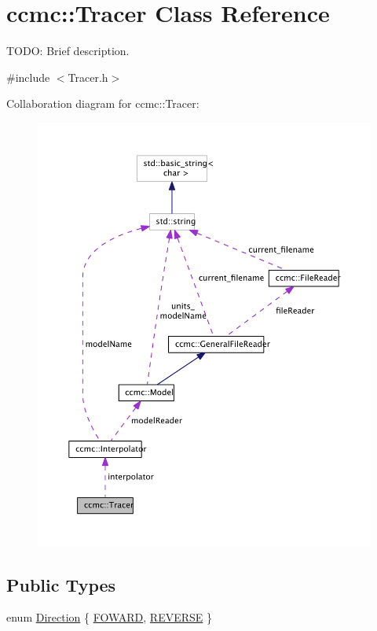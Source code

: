 \hypertarget{classccmc_1_1_tracer}{\section{ccmc\-:\-:Tracer Class Reference}
\label{classccmc_1_1_tracer}
}


T\-O\-D\-O\-: Brief description.  




{\ttfamily \#include $<$Tracer.\-h$>$}



Collaboration diagram for ccmc\-:\-:Tracer\-:\nopagebreak
\begin{figure}[H]
\begin{center}
\leavevmode
\includegraphics[width=350pt]{classccmc_1_1_tracer__coll__graph}
\end{center}
\end{figure}
\subsection*{Public Types}
\begin{DoxyCompactItemize}
\item 
enum \hyperlink{classccmc_1_1_tracer_a2c914b28e2e205cb1a7c01f2941fcae2}{Direction} \{ \hyperlink{classccmc_1_1_tracer_a2c914b28e2e205cb1a7c01f2941fcae2a133381f1178a2affb0f1c79a67b45e52}{F\-O\-W\-A\-R\-D}, 
\hyperlink{classccmc_1_1_tracer_a2c914b28e2e205cb1a7c01f2941fcae2af2f8ce1e1224ce9d334d5260fa8a8526}{R\-E\-V\-E\-R\-S\-E}
 \}
\end{DoxyCompactItemize}
